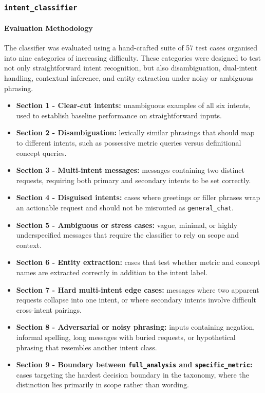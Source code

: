 \subsubsection{\texttt{intent\_classifier}}
\paragraph{Evaluation Methodology}

The classifier was evaluated using a hand-crafted suite of 57 test cases organised into nine categories of increasing difficulty. These categories were designed to test not only straightforward intent recognition, but also disambiguation, dual-intent handling, contextual inference, and entity extraction under noisy or ambiguous phrasing.

\begin{itemize}
    \item \textbf{Section 1 - Clear-cut intents:} unambiguous examples of all six intents, used to establish baseline performance on straightforward inputs.
    \item \textbf{Section 2 - Disambiguation:} lexically similar phrasings that should map to different intents, such as possessive metric queries versus definitional concept queries.
    \item \textbf{Section 3 - Multi-intent messages:} messages containing two distinct requests, requiring both primary and secondary intents to be set correctly.
    \item \textbf{Section 4 - Disguised intents:} cases where greetings or filler phrases wrap an actionable request and should not be misrouted as \texttt{general\_chat}.
    \item \textbf{Section 5 - Ambiguous or stress cases:} vague, minimal, or highly underspecified messages that require the classifier to rely on scope and context.
    \item \textbf{Section 6 - Entity extraction:} cases that test whether metric and concept names are extracted correctly in addition to the intent label.
    \item \textbf{Section 7 - Hard multi-intent edge cases:} messages where two apparent requests collapse into one intent, or where secondary intents involve difficult cross-intent pairings.
    \item \textbf{Section 8 - Adversarial or noisy phrasing:} inputs containing negation, informal spelling, long messages with buried requests, or hypothetical phrasing that resembles another intent class.
    \item \textbf{Section 9 - Boundary between \texttt{full\_analysis} and \texttt{specific\_metric}:} cases targeting the hardest decision boundary in the taxonomy, where the distinction lies primarily in scope rather than wording.
\end{itemize}

